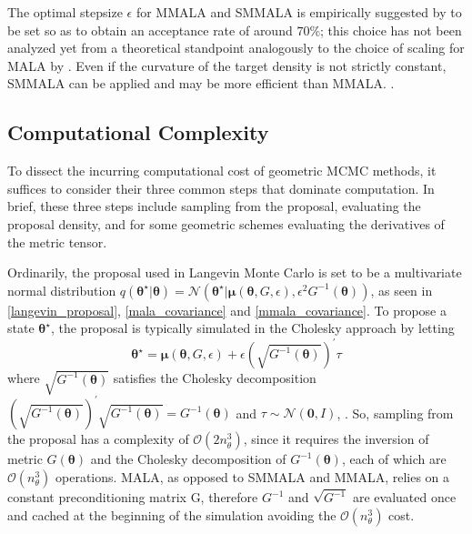 \documentclass[twoside,11pt]{article}
\begin{document}
The optimal stepsize $\epsilon$ for MMALA and SMMALA is empirically suggested by \cite{gir_cal__rie} to be set so as to 
obtain an acceptance rate of around $70\%$; this choice has not been analyzed yet from a theoretical standpoint analogously 
to the choice of scaling for MALA by \cite{rob_ros__opt}.
Even if the curvature of the target density is not strictly constant, SMMALA can be applied and may be more efficient than MMALA.  .  

\subsection{Computational Complexity}
\label{Motivation}

To dissect the incurring computational cost of geometric MCMC methods, it suffices to consider their three common steps
that dominate computation. In brief, these three steps include sampling from the proposal, evaluating the proposal density,
and for some geometric schemes evaluating the derivatives of the metric tensor.

Ordinarily, the proposal used in Langevin Monte Carlo is set to be a multivariate normal distribution
$
q(\boldsymbol{\theta}^{\star}|\boldsymbol{\theta}) =
\mathcal{N}(\boldsymbol{\theta}^{\star}|
\boldsymbol{\mu}(\boldsymbol{\theta}, G, \epsilon), \epsilon^2 G^{-1}(\boldsymbol{\theta}))
$,
as seen in \eqref{langevin_proposal}, \eqref{mala_covariance} and \eqref{mmala_covariance}. To propose a state 
$\boldsymbol{\theta}^{\star}$, the proposal is typically simulated in the Cholesky approach by letting
\begin{equation}
\boldsymbol{\theta}^{\star} =
\boldsymbol{\mu}(\boldsymbol{\theta}, G, \epsilon)+
\epsilon \left(\sqrt{G^{-1}(\boldsymbol{\theta})}\right)^{'}\tau
\end{equation}
where $\sqrt{G^{-1}(\boldsymbol{\theta})}$ satisfies the Cholesky decomposition
$
\left(\sqrt{G^{-1}(\boldsymbol{\theta})}\right)^{'}\sqrt{G^{-1}(\boldsymbol{\theta})}=
G^{-1}(\boldsymbol{\theta})
$
and $\tau\sim\mathcal{N}(\mathbf{0}, I)$, \cite{chi_gre__und}.
So, sampling from the proposal has a complexity of $\mathcal{O}(2n_\theta^3)$, since it requires the inversion of metric 
$G(\boldsymbol{\theta})$ and the Cholesky decomposition of $G^{-1}(\boldsymbol{\theta})$, each of which are
$\mathcal{O}(n_\theta^3)$ operations. MALA, as opposed to SMMALA and MMALA, relies on a constant preconditioning matrix G,
therefore $G^{-1}$ and $\sqrt{G^{-1}}$ are evaluated once and cached at the beginning of the simulation avoiding the
$\mathcal{O}(n_\theta^3)$ cost.
\end{document}
